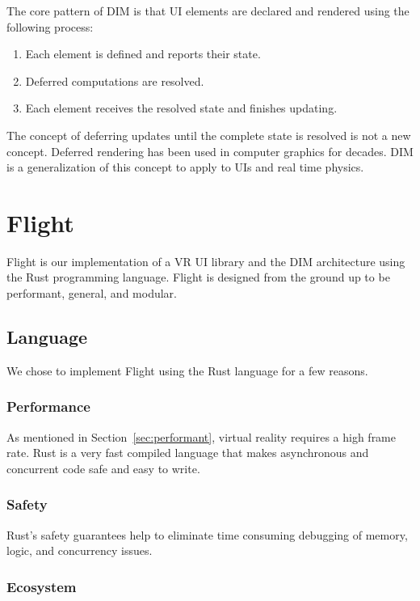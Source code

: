 \documentclass[conference,12pt]{IEEEtran}
\begin{document}
The core pattern of DIM is that UI elements are declared and rendered using the
following process:
\begin{enumerate}
    \item Each element is defined and reports their state.
    \item Deferred computations are resolved.
    \item Each element receives the resolved state and finishes updating.
\end{enumerate}

The concept of deferring updates until the complete state is resolved is not a
new concept. Deferred rendering has been used in computer graphics for decades.
DIM is a generalization of this concept to apply to UIs and real time physics.

\section{Flight}\label{sec:flight}

Flight is our implementation of a VR UI library and the DIM architecture using
the Rust programming language. Flight is designed from the ground up to be
performant, general, and modular.

\subsection{Language}

We chose to implement Flight using the Rust language for a few reasons.

\subsubsection{Performance}

As mentioned in Section~\ref{sec:performant}, virtual reality requires a high
frame rate. Rust is a very fast compiled language that makes asynchronous and
concurrent code safe and easy to write.

\subsubsection{Safety}

Rust's safety guarantees help to eliminate time consuming debugging of memory,
logic, and concurrency issues.

\subsubsection{Ecosystem}
\end{document}
